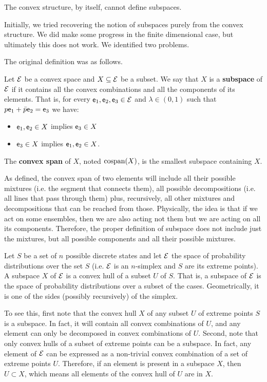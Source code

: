 \begin{insight}
	The convex structure, by itself, cannot define subspaces.
\end{insight}

Initially, we tried recovering the notion of subspaces purely from the convex structure. We did make some progress in the finite dimensional case, but ultimately this does not work. We identified two problems.

The original definition was as follows.

\begin{defn}
	Let $\mathcal{E}$ be a convex space and $X \subseteq \mathcal{E}$ be a subset. We say that $X$ is a \textbf{subspace} of $\mathcal{E}$ if it contains all the convex combinations and all the components of its elements. That is, for every $\mathsf{e}_1, \mathsf{e}_2, \mathsf{e}_3 \in \mathcal{E}$ and $\lambda \in (0,1)$ such that $p \mathsf{e}_1 + \bar{p} \mathsf{e}_2 = \mathsf{e}_3$ we have:
	\begin{itemize}
		\item $\mathsf{e}_1, \mathsf{e}_2 \in X$ implies $\mathsf{e}_3 \in X$
		\item $\mathsf{e}_3 \in X$ implies $\mathsf{e}_1, \mathsf{e}_2 \in X$.
	\end{itemize}
	The \textbf{convex span} of $X$, noted $\mathrm{cospan}(X)$, is the smallest subspace containing $X$.
\end{defn}

\begin{remark}
	As defined, the convex span of two elements will include all their possible mixtures (i.e. the segment that connects them), all possible decompositions (i.e. all lines that pass through them) plus, recursively, all other mixtures and decompositions that can be reached from those. Physically, the idea is that if we act on some ensembles, then we are also acting not them but we are acting on all its components. Therefore, the proper definition of subspace does not include just the mixtures, but all possible components and all their possible mixtures.
\end{remark}

\begin{example}
	Let $S$ be a set of $n$ possible discrete states and let $\mathcal{E}$ the space of probability distributions over the set $S$ (i.e. $\mathcal{E}$ is an $n$-simplex and $S$ are its extreme points). A subspace $X$ of $\mathcal{E}$ is a convex hull of a subset $U$ of $S$. That is, a subspace of $\mathcal{E}$ is the space of probability distributions over a subset of the cases. Geometrically, it is one of the sides (possibly recursively) of the simplex.
	
	To see this, first note that the convex hull $X$ of any subset $U$ of extreme points $S$ is a subspace. In fact, it will contain all convex combinations of $U$, and any element can only be decomposed in convex combinations of $U$. Second, note that only convex hulls of a subset of extreme points can be a subspace. In fact, any element of $\mathcal{E}$ can be expressed as a non-trivial convex combination of a set of extreme points $U$. Therefore, if an element is present in a subspace $X$, then $U \subset X$, which means all elements of the convex hull of $U$ are in $X$.
\end{example}

